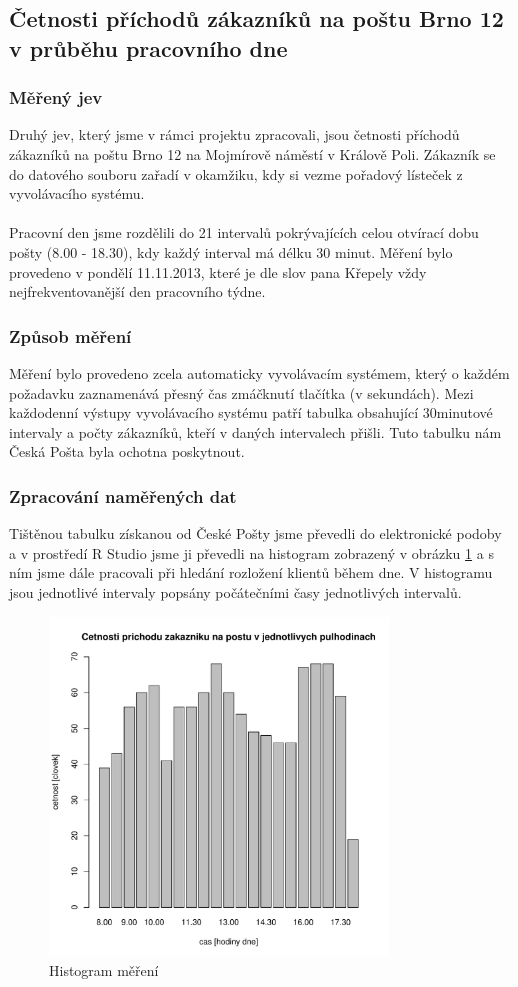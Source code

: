 \documentclass[12pt,a4paper]{article}
\begin{document}
	\subsection{Četnosti příchodů zákazníků na poštu Brno 12 v průběhu pracovního dne}
		\subsubsection{Měřený jev}
		Druhý jev, který jsme v rámci projektu zpracovali, jsou četnosti příchodů zákazníků na poštu 
		Brno 12 na Mojmírově náměstí v Králově Poli. Zákazník se do datového souboru zařadí v okamžiku,
		kdy si vezme pořadový lísteček z vyvolávacího systému. \\ \\
		Pracovní den jsme rozdělili do 21 intervalů pokrývajících celou otvírací dobu pošty (8.00 - 18.30),
		kdy každý interval má délku 30 minut. Měření bylo provedeno v pondělí 11.11.2013, které je dle slov
		pana Křepely vždy nejfrekventovanější den pracovního týdne.

		\subsubsection{Způsob měření}
		Měření bylo provedeno zcela automaticky vyvolávacím systémem, který o každém požadavku zaznamenává
		přesný čas zmáčknutí tlačítka (v sekundách). Mezi každodenní výstupy vyvolávacího systému patří 
		tabulka obsahující 30minutové intervaly a počty zákazníků, kteří v daných intervalech přišli. Tuto
		tabulku nám Česká Pošta byla ochotna poskytnout.


		\subsubsection{Zpracování naměřených dat}
		Tištěnou tabulku získanou od České Pošty jsme převedli do elektronické podoby a v prostředí
		R Studio jsme ji převedli na histogram zobrazený v obrázku \ref{posta} a s ním jsme dále pracovali
		při hledání rozložení klientů během dne. V histogramu jsou jednotlivé intervaly popsány počátečními časy
		jednotlivých intervalů.

		\begin{figure}[ht!]
		\centering
		\includegraphics[width=90mm]{../measuring/postaBarPlot.pdf}
		\caption{Histogram měření}
		\label{posta}
		\end{figure}
\end{document}
